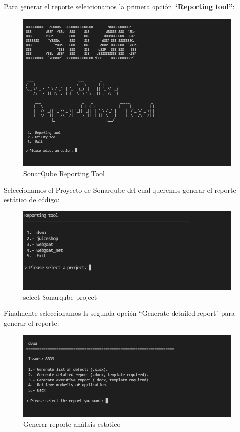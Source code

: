 Para generar el reporte seleccionamos la primera opción \textbf{“Reporting tool”}:
\begin{figure}[h!] 
    \captionsetup{width=1\linewidth}   
    \includegraphics[width=\linewidth]{./imagenes/017_SonarQubeReportTool_1.png}
    \caption{SonarQube Reporting Tool}  
    \label{fig:15 - SonarQube Reporting tool}
\end{figure}

Seleccionamos el Proyecto de Sonarqube del cual queremos generar el reporte estático de código:
\begin{figure}[h!] 
    \captionsetup{width=1\linewidth}   
    \includegraphics[width=\linewidth]{./imagenes/017_SonarQubeReportTool_2.png}
    \caption{select Sonarqube project}  
    \label{fig:16}
\end{figure}

Finalmente seleccionamos la segunda opción “Generate detailed report” para generar el reporte:

\begin{figure}[h!]
    \captionsetup{width=1\linewidth}    
    \includegraphics[width=\linewidth]{./imagenes/017_SonarQubeReportTool_3.png}
    \caption{Generar reporte análisis estatico}  
    \label{fig:17}
\end{figure}

